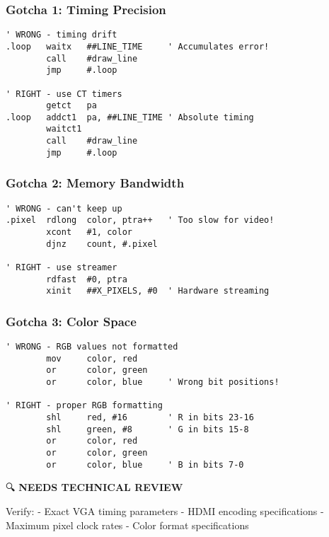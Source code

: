 \documentclass[11pt]{book}
\begin{document}
\hypertarget{gotcha-1-timing-precision}{%
\subsubsection{Gotcha 1: Timing
Precision}\label{gotcha-1-timing-precision}}

\begin{lstlisting}
' WRONG - timing drift
.loop   waitx   ##LINE_TIME     ' Accumulates error!
        call    #draw_line
        jmp     #.loop
        
' RIGHT - use CT timers
        getct   pa
.loop   addct1  pa, ##LINE_TIME ' Absolute timing
        waitct1
        call    #draw_line
        jmp     #.loop
\end{lstlisting}

\hypertarget{gotcha-2-memory-bandwidth}{%
\subsubsection{Gotcha 2: Memory
Bandwidth}\label{gotcha-2-memory-bandwidth}}

\begin{lstlisting}
' WRONG - can't keep up
.pixel  rdlong  color, ptra++   ' Too slow for video!
        xcont   #1, color
        djnz    count, #.pixel
        
' RIGHT - use streamer
        rdfast  #0, ptra
        xinit   ##X_PIXELS, #0  ' Hardware streaming
\end{lstlisting}

\hypertarget{gotcha-3-color-space}{%
\subsubsection{Gotcha 3: Color Space}\label{gotcha-3-color-space}}

\begin{lstlisting}
' WRONG - RGB values not formatted
        mov     color, red
        or      color, green
        or      color, blue     ' Wrong bit positions!
        
' RIGHT - proper RGB formatting
        shl     red, #16        ' R in bits 23-16
        shl     green, #8       ' G in bits 15-8
        or      color, red
        or      color, green
        or      color, blue     ' B in bits 7-0
\end{lstlisting}

\begin{review}
🔍 \textbf{NEEDS TECHNICAL REVIEW}

Verify:
- Exact VGA timing parameters
- HDMI encoding specifications
- Maximum pixel clock rates
- Color format specifications
\end{review}
\end{document}

